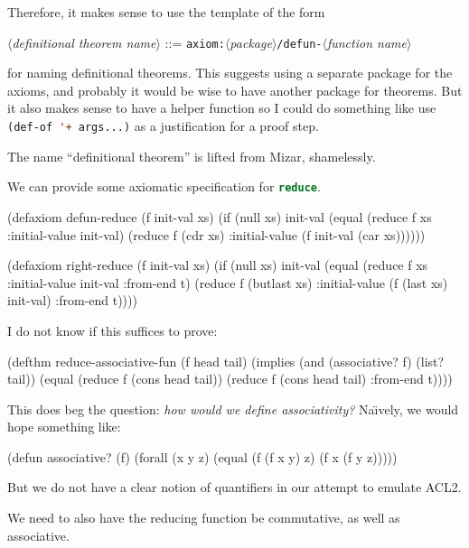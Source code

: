 \begin{remark}
  Therefore, it makes sense to use the template of the form
  \begin{center}
    $\langle$\emph{definitional theorem name}$\rangle$ ::=
\texttt{axiom:}$\langle$\emph{package}$\rangle$\texttt{/}\texttt{defun-}$\langle$\emph{function name}$\rangle$
  \end{center}
for naming definitional theorems. This suggests using a separate package
for the axioms, and probably it would be wise to have another package
for theorems. But it also makes sense to have a helper function so I
could do something like use \lstinline[language=lisp]{(def-of '+ args...)}
as a justification for a proof step.
\end{remark}

\begin{remark}
The name ``definitional theorem'' is lifted from Mizar, shamelessly.
\end{remark}

We can provide some axiomatic specification for
\lstinline[language=lisp]{reduce}.
\begin{lisp-example}
(defaxiom defun-reduce (f init-val xs)
  (if (null xs)
    init-val
    (equal (reduce f xs :initial-value init-val)
           (reduce f (cdr xs) :initial-value (f init-val (car xs))))))

(defaxiom right-reduce (f init-val xs)
  (if (null xs)
    init-val
    (equal (reduce f xs :initial-value init-val
                        :from-end t)
           (reduce f (butlast xs) :initial-value (f (last xs) init-val)
                                  :from-end t))))
\end{lisp-example}
I do not know if this suffices to prove:
\begin{lisp-example}
(defthm reduce-associative-fun (f head tail)
  (implies (and (associative? f)
                (list? tail))
           (equal (reduce f (cons head tail))
                  (reduce f (cons head tail)
                            :from-end t))))
\end{lisp-example}
This does beg the question: \emph{how would we define associativity?}
Na\"{\i}vely, we would hope something like:
\begin{lisp-example}
(defun associative? (f)
  (forall (x y z)
          (equal (f (f x y) z)
                 (f x (f y z)))))
\end{lisp-example}
But we do not have a clear notion of quantifiers in our attempt to
emulate ACL2.

\begin{remark}
We need to also have the reducing function be commutative, as well as associative.
\end{remark}
